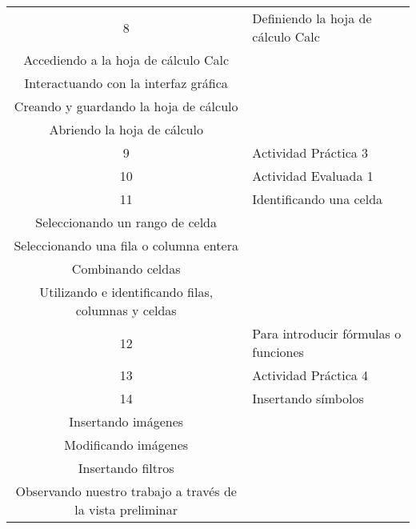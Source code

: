 \begin{center}
\begin{tabular}{|c|p{10cm}|}
                        \end{tabular}     
                        
                        \begin{tabular}{|c|p{10cm}|}\hline 

                        8 & \raggedright Definiendo la hoja de cálculo Calc\cite{calc}
                        \\ Accediendo a la hoja de cálculo Calc
                        \\ Interactuando con la interfaz gráfica
                        \\ Creando y guardando la hoja de cálculo
                        \\ Abriendo la hoja de cálculo
                        \tabularnewline \hline
                                   
                        9 & \raggedright Actividad Práctica 3
                        \tabularnewline \hline
                        
                        10 & \raggedright Actividad Evaluada 1
                        \tabularnewline \hline
                        
                        11 & \raggedright Identificando una celda
                        \\ Seleccionando un rango de celda
                        \\ Seleccionando una fila o columna entera
                        \\ Combinando celdas
                        \\ Utilizando e identificando filas, columnas y celdas
                        \tabularnewline \hline
                        12 & \raggedright Para introducir fórmulas o funciones
                        \tabularnewline \hline
                        
                        13 & \raggedright Actividad Práctica 4
                        \tabularnewline \hline
                        
                        14 & \raggedright Insertando símbolos
                        \\ Insertando imágenes
                        \\ Modificando imágenes
                        \\ Insertando filtros
                        \\ Observando nuestro trabajo a través de la vista preliminar
                        \tabularnewline \hline
                        

\end{tabular}
\end{center}
